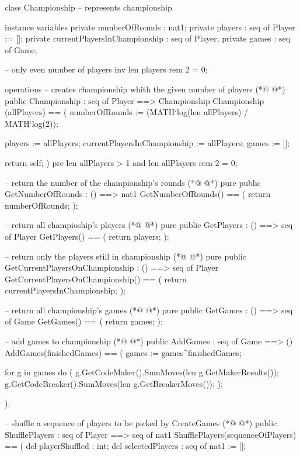 \begin{vdmpp}[breaklines=true]
class Championship -- represents championship 

instance variables
 private numberOfRounds : nat1;
 private players : seq of Player := [];
 private currentPlayersInChampionship : seq of Player;
 private games : seq of Game;
 
 -- only even number of players
 inv len players rem 2 = 0;
 
operations
 -- creates championship whith the given number of players
(*@
\label{Championship:14}
@*)
 public Championship : seq of Player ==> Championship
  Championship (allPlayers) == (
   numberOfRounds := (MATH`log(len allPlayers) / MATH`log(2));
 
   players := allPlayers;
   currentPlayersInChampionship := allPlayers;
   games := [];
   
   return self;
  )
 pre len allPlayers > 1 and len allPlayers rem 2 = 0;

 -- return the number of the championship's rounds
(*@
\label{GetNumberOfRounds:27}
@*)
 pure public GetNumberOfRounds : () ==> nat1
  GetNumberOfRounds() == (
   return numberOfRounds;
  );

 -- return all champioship's players
(*@
\label{GetPlayers:33}
@*)
 pure public GetPlayers : () ==> seq of Player
  GetPlayers() == (
   return players;
  );


 -- return only the players still in championship
(*@
\label{GetCurrentPlayersOnChampionship:40}
@*)
 pure public GetCurrentPlayersOnChampionship : () ==> seq of Player
  GetCurrentPlayersOnChampionship() == (
   return currentPlayersInChampionship;
  );
 
 -- return all championship's games
(*@
\label{GetGames:46}
@*)
 pure public GetGames : () ==> seq of Game
  GetGames() == (
   return games;
  );
  
 -- add games to championship
(*@
\label{AddGames:52}
@*)
 public AddGames : seq of Game ==> ()
  AddGames(finishedGames) == (
   games := games^finishedGames;
   
   for g in games do (
    g.GetCodeMaker().SumMoves(len g.GetMakerResults());
    g.GetCodeBreaker().SumMoves(len g.GetBreakerMoves());
   );
   
  );
 
 -- shuffle a sequence of players to be picked by CreateGames
(*@
\label{ShufflePlayers:64}
@*)
 public ShufflePlayers : seq of Player ==> seq of nat1
  ShufflePlayers(sequenceOfPlayers) == (
   dcl playerShuffled : int;
   dcl selectedPlayers : seq of nat1 := [];
   

\end{vdmpp}
